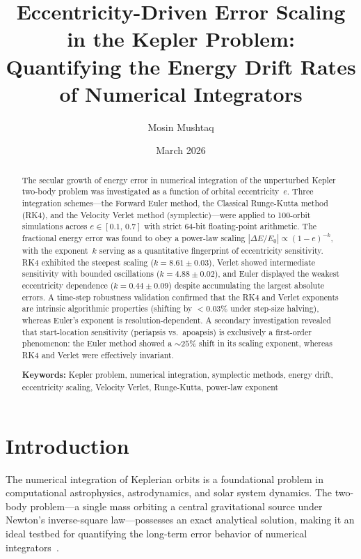 \documentclass[twocolumn, 10pt]{article}
\title{\textbf{Eccentricity-Driven Error Scaling in the Kepler Problem:\\ Quantifying the Energy Drift Rates of Numerical Integrators}}
\author{Mosin Mushtaq}
\date{March 2026}
\begin{document}
\maketitle

\begin{abstract}
The secular growth of energy error in numerical integration of the unperturbed Kepler two-body problem was investigated as a function of orbital eccentricity~$e$. Three integration schemes---the Forward Euler method, the Classical Runge-Kutta method (RK4), and the Velocity Verlet method (symplectic)---were applied to 100-orbit simulations across $e \in [0.1,\, 0.7]$ with strict 64-bit floating-point arithmetic. The fractional energy error was found to obey a power-law scaling $|\Delta E / E_0| \propto (1 - e)^{-k}$, with the exponent~$k$ serving as a quantitative fingerprint of eccentricity sensitivity. RK4 exhibited the steepest scaling ($k = 8.61 \pm 0.03$), Verlet showed intermediate sensitivity with bounded oscillations ($k = 4.88 \pm 0.02$), and Euler displayed the weakest eccentricity dependence ($k = 0.44 \pm 0.09$) despite accumulating the largest absolute errors. A time-step robustness validation confirmed that the RK4 and Verlet exponents are intrinsic algorithmic properties (shifting by $< 0.03\%$ under step-size halving), whereas Euler's exponent is resolution-dependent. A secondary investigation revealed that start-location sensitivity (periapsis vs.\ apoapsis) is exclusively a first-order phenomenon: the Euler method showed a ${\sim}25\%$ shift in its scaling exponent, whereas RK4 and Verlet were effectively invariant.

\medskip
\noindent\textbf{Keywords:} Kepler problem, numerical integration, symplectic methods, energy drift, eccentricity scaling, Velocity Verlet, Runge-Kutta, power-law exponent
\end{abstract}

\section{Introduction}

The numerical integration of Keplerian orbits is a foundational problem in computational astrophysics, astrodynamics, and solar system dynamics. The two-body problem---a single mass orbiting a central gravitational source under Newton's inverse-square law---possesses an exact analytical solution, making it an ideal testbed for quantifying the long-term error behavior of numerical integrators~\cite{kinoshita1991}.
\end{document}
